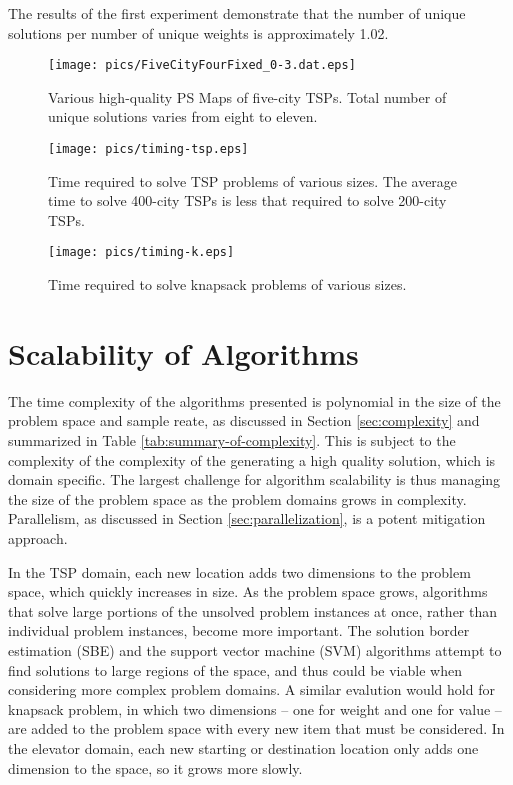 The results of the first experiment demonstrate that the number of unique solutions per number of unique weights is approximately 1.02.




\begin{figure}
\begin{center}
\texttt{[image: pics/FiveCityFourFixed\_0-3.dat.eps]}
\caption{Various high-quality PS Maps of five-city TSPs.  Total number of unique solutions varies from eight to eleven.}
\label{fig:five_city_tsps}
\end{center}
\end{figure}


\begin{figure}
\begin{center}
\texttt{[image: pics/timing-tsp.eps]}
\caption{Time required to solve TSP problems of various sizes.  The average time to solve 400-city TSPs is less that required to solve 200-city TSPs.}
\label{fig:timing-tsp}
\end{center}
\end{figure}

\begin{figure}
\begin{center}
\texttt{[image: pics/timing-k.eps]}
\caption{Time required to solve knapsack problems of various sizes.}
\label{fig:timing-k}
\end{center}
\end{figure}


\section{Scalability of Algorithms}

The time complexity of the algorithms presented is polynomial in the size of the problem space and sample reate, as discussed in Section \ref{sec:complexity} and summarized in Table \ref{tab:summary-of-complexity}.  This is subject to the complexity of the complexity of the generating a high quality solution, which is domain specific.  The largest challenge for algorithm scalability is thus managing the size of the problem space as the problem domains grows in complexity.  Parallelism, as discussed in Section \ref{sec:parallelization}, is a potent mitigation approach.

In the TSP domain, each new location adds two dimensions to the problem space, which quickly increases in size.  As the problem space grows, algorithms that solve large portions of the unsolved problem instances at once, rather than individual problem instances, become more important.  The solution border estimation (SBE) and the support vector machine (SVM) algorithms attempt to find solutions to large regions of the space, and thus could be viable when considering more complex problem domains.  A similar evalution would hold for knapsack problem, in which two dimensions -- one for weight and one for value -- are added to the problem space with every new item that must be considered.  In the elevator domain, each new starting or destination location only adds one dimension to the space, so it grows more slowly.

